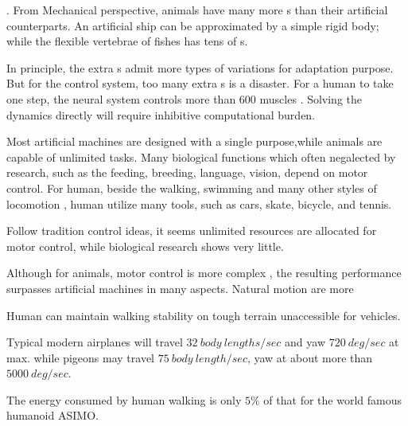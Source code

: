 \begin{itemize}
.
From Mechanical perspective, animals have many more {\dof}s than their artificial counterparts.
An artificial ship can be approximated by a simple rigid body; while the flexible vertebrae of fishes has tens of {\dof}s.


In principle, the extra {\dof}s admit more types of variations for adaptation purpose. 
But for the control system, too many extra {\dof}s is a disaster. 
For a human to take one step,  the neural system controls more than $600$ muscles .
Solving the dynamics directly will require inhibitive computational burden.

 
Most artificial machines are designed with a single purpose,while animals are capable  of unlimited tasks.
Many biological functions which often negalected by \cms research, such as the feeding, breeding, language, vision, depend on motor control. 
For human, beside the walking, swimming and many other styles of locomotion , human utilize many tools, such as cars, skate, bicycle, and tennis.

Follow tradition control ideas, it seems unlimited resources are allocated for motor control, while biological research shows very little.

Although for animals,  motor control is more complex , the resulting performance surpasses artificial machines in many aspects.
Natural motion are more
\begin{enumerate} 

Human can maintain walking stability on tough terrain unaccessible for vehicles.

Typical modern airplanes will travel $32\: body\: lengths/sec$ and yaw $720\: deg/sec$ at max.
while pigeons may travel $75 \:body\: length / sec$, yaw at about more than $5000 \: deg/sec$.

The energy consumed by human walking is only $5\%$ of that for the world famous humanoid ASIMO.
\end{enumerate}

\end{itemize}



